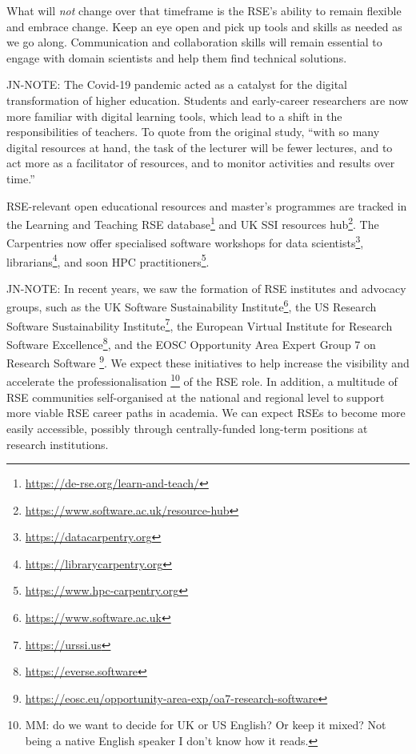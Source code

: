 \documentclass{eceasst}
\begin{document}
What will \emph{not} change over that timeframe is the RSE's ability to remain
flexible and embrace change. Keep an eye open and pick up tools and skills
as needed as we go along.
Communication and collaboration skills will remain essential to engage
with domain scientists and help them find technical solutions.

\begin{FramedParagraphWithFootnotes}
JN-NOTE:
The Covid-19 pandemic acted as a catalyst for the digital transformation
of higher education\cite{Bygstad2022}. Students and early-career researchers
are now more familiar with digital learning tools, which lead to a shift
in the responsibilities of teachers. To quote from the original study,
``with so many digital resources at hand,
the task of the lecturer will be fewer lectures,
and to act more as a facilitator of resources,
and to monitor activities and results over time.''\cite{Bygstad2022}

RSE-relevant open educational resources and master's programmes are tracked
in the Learning and Teaching RSE database\footnote{\url{https://de-rse.org/learn-and-teach/}}
and UK SSI resources hub\footnote{\url{https://www.software.ac.uk/resource-hub}}.
The Carpentries now offer specialised software workshops
for data scientists\footnote{\url{https://datacarpentry.org}},
librarians\footnote{\url{https://librarycarpentry.org}},
and soon HPC practitioners\footnote{\url{https://www.hpc-carpentry.org}}.
\end{FramedParagraphWithFootnotes}

\begin{FramedParagraphWithFootnotes}
JN-NOTE:
In recent years, we saw the formation of RSE institutes and advocacy groups, such as
the UK Software Sustainability Institute\footnote{\url{https://www.software.ac.uk}},
the US Research Software Sustainability Institute\footnote{\url{https://urssi.us}},
the European Virtual Institute for Research Software Excellence\footnote{\url{https://everse.software}},
and the EOSC Opportunity Area Expert Group 7 on Research Software%
\footnote{\url{https://eosc.eu/opportunity-area-exp/oa7-research-software}}.
We expect these initiatives to help increase the visibility and accelerate
the professionalisation%
\footnote{MM: do we want to decide for UK or US English? Or keep it mixed? Not being a native English speaker I don't know how it reads.}
of the RSE role.
In addition, a multitude of RSE communities self-organised at the national
and regional level to support more viable RSE career paths in academia.
We can expect RSEs to become more easily accessible,
possibly through centrally-funded long-term positions at research institutions.
\end{FramedParagraphWithFootnotes}
\end{document}
